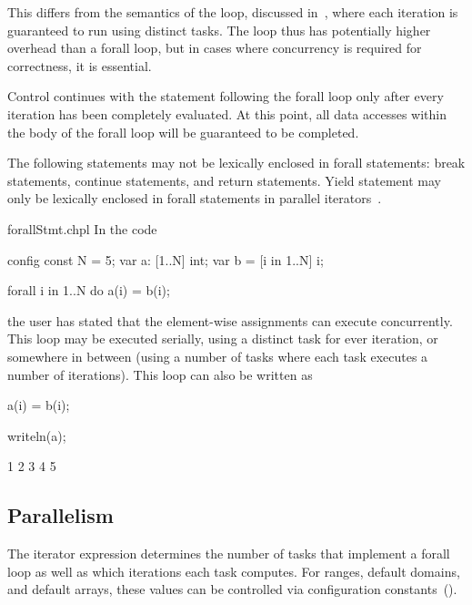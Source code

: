 This differs from the semantics of the  loop, discussed
in~, where each iteration is guaranteed to run using
distinct tasks.  The  loop thus has potentially higher
overhead than a forall loop, but in cases where concurrency is
required for correctness, it is essential.

Control continues with the statement following the forall loop only
after every iteration has been completely evaluated.  At this point,
all data accesses within the body of the forall loop will be
guaranteed to be completed.

The following statements may not be lexically enclosed in forall
statements: break statements, continue statements, and return
statements.  Yield statement may only be lexically enclosed in forall
statements in parallel iterators~.

\begin{chapelexample}{forallStmt.chpl}
In the code
\begin{chapelpre}
config const N = 5;
var a: [1..N] int;
var b = [i in 1..N] i;
\end{chapelpre}
\begin{chapel}
forall i in 1..N do
  a(i) = b(i);
\end{chapel}
the user has stated that the element-wise assignments can execute
concurrently.  This loop may be executed serially, using a distinct
task for ever iteration, or somewhere in between (using a number of
tasks where each task executes a number of iterations).  This loop can
also be written as
\begin{chapel}
[i in 1..N] a(i) = b(i);
\end{chapel}
\begin{chapelpost}
writeln(a);
\end{chapelpost}
\begin{chapeloutput}
1 2 3 4 5
\end{chapeloutput}
\end{chapelexample}

\subsection{Parallelism}
\label{forall_parallelism}

The iterator expression determines the number of tasks that implement
a forall loop as well as which iterations each task computes.  For
ranges, default domains, and default arrays, these values can be
controlled via configuration constants~().

